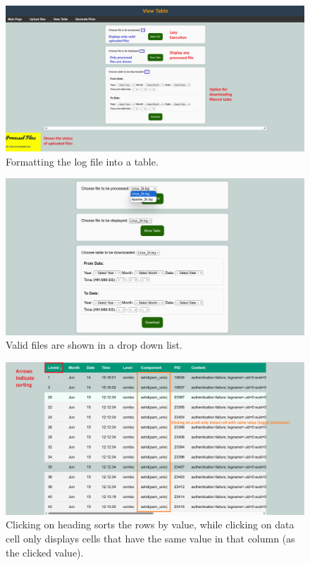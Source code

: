 \documentclass[11pt]{scrartcl}
\begin{document}
\begin{figure}[htbp]
  
  \centering
  \includegraphics[width=\linewidth]{images/tablepage.png}
  \caption{Formatting the log file into a table.}
  \label{tablepage}

\end{figure}


\begin{figure}
  
  \centering
  \includegraphics[width=\linewidth]{images/tableform.png}
  \caption{Valid files are shown in a drop down list.}
  \label{tableform}

\end{figure}



\begin{figure}
  
  \centering
  \includegraphics[width=\linewidth]{images/tableclick.png}
  \caption{Clicking on heading sorts the rows by value, while clicking on data
  cell only displays cells that have the same value in that column (as the
  clicked value).}
  \label{tableclick}

\end{figure}
\end{document}
